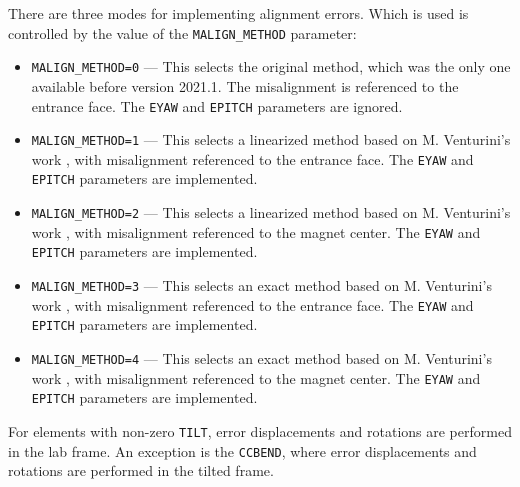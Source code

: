 There are three modes for implementing alignment errors. Which is used
is controlled by the value of the \verb|MALIGN_METHOD| parameter:
\begin{itemize}
\item \verb|MALIGN_METHOD=0| --- This selects the original method, which was
  the only one available before version 2021.1. The misalignment is
  referenced to the entrance face. The \verb|EYAW| and \verb|EPITCH| parameters
  are ignored. 
\item \verb|MALIGN_METHOD=1| --- This selects a linearized method based on M. Venturini's
  work \cite{Venturini2021}, with misalignment referenced to the entrance face.
  The \verb|EYAW| and \verb|EPITCH| parameters are implemented.
\item \verb|MALIGN_METHOD=2| --- This selects a linearized method based on M. Venturini's
  work \cite{Venturini2021}, with misalignment referenced to the magnet center.
  The \verb|EYAW| and \verb|EPITCH| parameters are implemented.
\item \verb|MALIGN_METHOD=3| --- This selects an exact method based on M. Venturini's
  work \cite{Venturini2021}, with misalignment referenced to the entrance face.
  The \verb|EYAW| and \verb|EPITCH| parameters are implemented.
\item \verb|MALIGN_METHOD=4| --- This selects an exact method based on M. Venturini's
  work \cite{Venturini2021}, with misalignment referenced to the magnet center.
  The \verb|EYAW| and \verb|EPITCH| parameters are implemented.
\end{itemize}

For elements with non-zero \verb|TILT|, error displacements and rotations are performed in the lab frame.
An exception is the \verb|CCBEND|, where error displacements and rotations are performed in the tilted frame.
